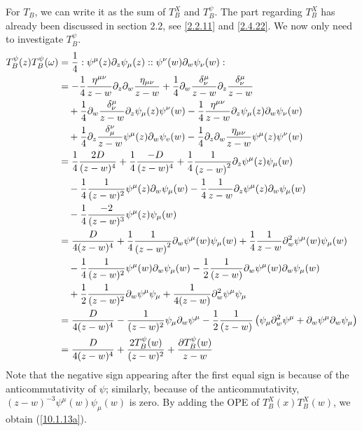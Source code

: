 \begin{tcolorbox}[breakable]
	For $T_{B}$, we can write it as the sum of $T_{B}^{X}$ and $T_{B}^{\psi }$. The part regarding $T_{B}^{X}$ has already been discussed in section 2.2, see \eqref{2.2.11} and \eqref{2.4.22}. We now only need to investigate $T_{B}^{\psi }$.%
	\begin{align*}
		T_{B}^{\psi }(z)T_{B}^{\psi }(\omega ) &=\frac{1}{4}:\psi ^{\mu
		}(z)\partial _{z}\psi _{\mu }(z)::\psi ^{\nu }(w)\partial _{w}\psi _{\nu
		}(w): \\
		&=-\frac{1}{4}\frac{\eta ^{\mu \nu }}{z-w}\partial _{z}\partial _{w}\frac{%
			\eta _{\mu \nu }}{z-w}+\frac{1}{4}\partial _{w}\frac{\delta _{\nu }^{\mu }}{%
			z-w}\partial _{z}\frac{\delta _{\nu }^{\mu }}{z-w} \\
		&\quad+\frac{1}{4}\partial _{w}\frac{\delta _{\nu }^{\mu }}{z-w}\partial
		_{z}\psi _{\mu }(z)\psi ^{\nu }(w)-\frac{1}{4}\frac{\eta ^{\mu \nu }}{z-w}%
		\partial _{z}\psi _{\mu }(z)\partial _{w}\psi _{\nu }(w) \\
		&\quad+\frac{1}{4}\partial _{z}\frac{\delta _{\mu }^{\nu }}{z-w}\psi ^{\mu
		}(z)\partial _{w}\psi _{v}(w)-\frac{1}{4}\partial _{z}\partial _{w}\frac{%
			\eta _{\mu \nu }}{z-w}\psi ^{\mu }(z)\psi ^{\nu }(w) \\
		&=\frac{1}{4}\frac{2D}{(z-w)^{4}}+\frac{1}{4}\frac{-D}{(z-w)^{4}}+\frac{1}{4%
		}\frac{1}{\left( z-w\right) ^{2}}\partial _{z}\psi ^{\mu }(z)\psi _{\mu }(w)
		\\
		&\quad-\frac{1}{4}\frac{1}{(z-w)^{2}}\psi ^{\mu }(z)\partial _{w}\psi _{\mu }(w)-%
		\frac{1}{4}\frac{1}{z-w}\partial _{z}\psi ^{\mu }(z)\partial _{w}\psi _{\mu
		}(w) \\
		&\quad-\frac{1}{4}\frac{-2}{(z-w)^{3}}\psi ^{\mu }(z)\psi _{\mu }(w) \\
		&=\frac{D}{4(z-w)^{4}}+\frac{1}{4}\frac{1}{\left( z-w\right) ^{2}}\partial
		_{w}\psi ^{\mu }(w)\psi _{\mu }(w)+\frac{1}{4}\frac{1}{z-w}\partial
		_{w}^{2}\psi ^{\mu }(w)\psi _{\mu }(w) \\
		&\quad-\frac{1}{4}\frac{1}{(z-w)^{2}}\psi ^{\mu }(w)\partial _{w}\psi _{\mu }(w)-%
		\frac{1}{2}\frac{1}{(z-w)}\partial _{w}\psi ^{\mu }(w)\partial _{w}\psi
		_{\mu }(w) \\
		&\quad+\frac{1}{2}\frac{1}{(z-w)^{2}}\partial _{w}\psi ^{\mu }\psi _{\mu
		} +\frac{1}{4(z-w)}\partial _{w}^{2}\psi ^{\mu }\psi _{\mu } \\
		&=\frac{D}{4(z-w)^{4}}-\frac{1}{(z-w)^{2}}\psi _{\mu }\partial _{w}\psi
		^{\mu }-\frac{1}{2}\frac{1}{(z-w)}\left( \psi _{\mu }\partial _{w}^{2}\psi
		^{\mu }+\partial _{w}\psi ^{\mu }\partial _{w}\psi _{\mu }\right)  \\
		&=\frac{D}{4(z-w)^{4}}+\frac{2T_{B}^{\psi }(w)}{(z-w)^{2}}+\frac{\partial
			T_{B}^{\psi }(w)}{z-w}
	\end{align*}
	Note that the negative sign appearing after the first equal sign is because of the anticommutativity of $\psi$; similarly, because of the anticommutativity, $(z-w)^{-3}\psi^{\mu}(w)\psi_{\mu}(w)$ is zero. By adding the OPE of $T_{B}^{X}(x)T_{B}^{X}(w)$, we obtain (\ref{10.1.13a}).
	

\end{tcolorbox}

